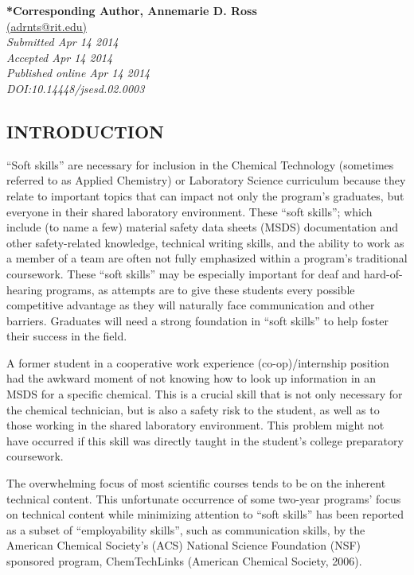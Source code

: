 \documentclass[11.5pt]{sig-alternate} %
\begin{document}
\textbf{*Corresponding Author, Annemarie D. Ross} \\
\href{mailto:adrnts@rit.edu}{(adrnts@rit.edu)} \\
\textit{Submitted  Apr 14 2014} \\
\textit{Accepted Apr 14 2014} \\
\textit{Published online Apr 14 2014} \\
\textit{DOI:10.14448/jsesd.02.0003} \\
\pagebreak
\clearpage
\begin{large}
\section*{INTRODUCTION}

“Soft skills” are necessary for inclusion in the Chemical Technology (sometimes referred to as Applied Chemistry) or Laboratory Science curriculum because they relate to important topics that can impact not only the program’s graduates, but everyone in their shared laboratory environment. These “soft skills”; which include (to name a few) material safety data sheets (MSDS) documentation and other safety-related knowledge, technical writing skills, and the ability to work as a member of a team are often not fully emphasized within a program’s traditional coursework. These “soft skills” may be especially important for deaf and hard-of-hearing programs, as attempts are to give these students every possible competitive advantage as they will naturally face communication and other barriers. Graduates will need a strong foundation in “soft skills” to help foster their success in the field.

A former student in a cooperative work experience (co-op)/internship position had the awkward moment of not knowing how to look up information in an MSDS for a specific chemical. This is a crucial skill that is not only necessary for the chemical technician, but is also a safety risk to the student, as well as to those working in the shared laboratory environment. This problem might not have occurred if this skill was directly taught in the student’s college preparatory coursework.

The overwhelming focus of most scientific courses tends to be on the inherent technical content. This unfortunate occurrence of some two-year programs’ focus on technical content while minimizing attention to “soft skills” has been reported as a subset of “employability skills”, such as communication skills, by the American Chemical Society’s (ACS) National Science Foundation (NSF) sponsored program, ChemTechLinks (American Chemical Society, 2006).


\end{large}
\end{document}
